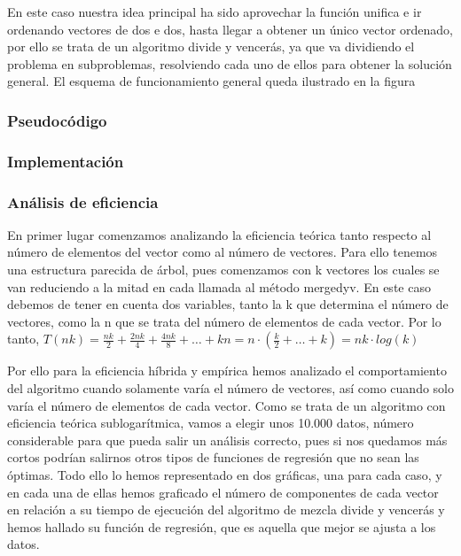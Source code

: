En este caso nuestra idea principal ha sido aprovechar la función unifica e ir ordenando vectores de dos e dos,
hasta llegar a obtener un único vector ordenado, por ello se trata de un algoritmo divide y vencerás, ya que va dividiendo 
el problema en subproblemas, resolviendo cada uno de ellos para obtener la solución general. 
El esquema de funcionamiento general queda ilustrado en la figura 

\begin{figure}
\end{figure}

\subsubsection{Pseudocódigo}



\subsubsection{Implementación}



\subsubsection{Análisis de eficiencia}

En primer lugar comenzamos analizando la eficiencia teórica tanto respecto al número de elementos del vector como al número de vectores.
Para ello tenemos una estructura parecida de árbol, pues comenzamos con k vectores los cuales se van reduciendo a la mitad en cada llamada al método mergedyv.
En este caso debemos de tener en cuenta dos variables, tanto la k que determina el número de vectores, como la n que se trata del número de elementos de cada vector.
Por lo tanto, $T(nk) = \frac{nk}{2} + \frac{2nk}{4} + \frac{4nk}{8} + \dots + kn = n \cdot (\frac{k}{2} +\dots +k)= nk \cdot log(k) $

Por ello para la eficiencia híbrida y empírica hemos analizado el comportamiento del algoritmo cuando solamente varía el número de vectores, así como cuando solo varía el número de 
elementos de cada vector. 
Como se trata de un algoritmo con eficiencia teórica sublogarítmica, vamos a elegir unos 10.000 datos, número considerable para que pueda salir un análisis correcto, pues si nos quedamos más cortos
podrían salirnos otros tipos de funciones de regresión que no sean las óptimas.
Todo ello lo hemos representado en dos gráficas, una para cada caso, y en cada una de ellas hemos graficado el número de componentes de cada vector en relación a su tiempo de ejecución del algoritmo de mezcla
divide y vencerás y hemos hallado su función de regresión, que es aquella que mejor se ajusta a los datos.


